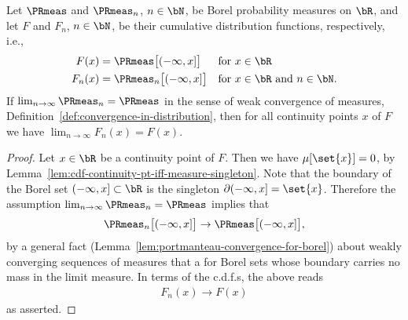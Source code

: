 \begin{lemma}
  \label{lem:cdf-convergence-from-convergence-in-distribution}
  \leanok
  Let $\PRmeas$ and $\PRmeas_n$, $n \in \bN$, be Borel
  probability measures on $\bR$, and let $F$ and $F_n$, $n \in \bN$,
  be their cumulative distribution functions, respectively, i.e.,
  \begin{align*}
      F(x) = \; & \PRmeas \big[(-\infty,x]\big] & & \text{for $x \in \bR$} \\
      F_n(x) = \; & \PRmeas_n \big[(-\infty,x]\big] & & \text{for $x \in \bR$ and $n \in \bN$.}
  \end{align*}
  If $\lim_{n \to \infty} \PRmeas_n = \PRmeas$ in the sense of weak convergence
  of measures, Definition~\ref{def:convergence-in-distribution}, then
  for all continuity points $x$ of $F$ we have
  $\lim_{n \to \infty} F_n(x) = F(x)$.
\end{lemma}
\begin{proof}
  \leanok
  Let $x \in \bR$ be a continuity point of $F$. Then we have $\mu [\set{x}] = 0$,
  by Lemma~\ref{lem:cdf-continuity-pt-iff-measure-singleton}.
  Note that the boundary of the Borel set $(-\infty,x] \subset \bR$ is
  the singleton $\partial (-\infty,x] = \set{x}$.
  Therefore the assumption $\lim_{n \to \infty} \PRmeas_n = \PRmeas$ implies that
  \begin{align*}
    \PRmeas_n \big[ (-\infty,x] \big] \to \PRmeas \big[ (-\infty,x] \big] ,
  \end{align*}
  by a general fact (Lemma~\ref{lem:portmanteau-convergence-for-borel})
  about weakly converging sequences of measures
  that a for Borel sets whose boundary carries no mass in the limit measure.
  In terms of the c.d.f.s, the above reads
  \begin{align*}
    F_n(x) \to F(x)
  \end{align*}
  as asserted.
\end{proof}
